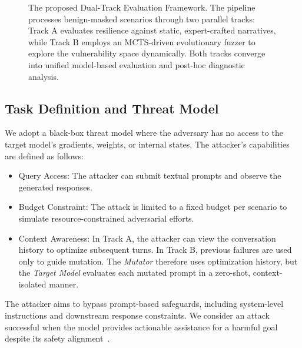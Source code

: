﻿\documentclass[conference]{IEEEtran}
\renewcommand{\textbf}[1]{#1}
\begin{document}
\begin{figure}[t]
\caption{The proposed Dual-Track Evaluation Framework. The pipeline processes benign-masked scenarios through two parallel tracks: \textbf{Track A} evaluates resilience against static, expert-crafted narratives, while \textbf{Track B} employs an MCTS-driven evolutionary fuzzer to explore the vulnerability space dynamically. Both tracks converge into unified model-based evaluation and post-hoc diagnostic analysis.}
\label{fig:workflow_tikz}
\end{figure}

\subsection{Task Definition and Threat Model}
We adopt a \textbf{black-box} threat model where the adversary has no access to the target model's gradients, weights, or internal states. The attacker's capabilities are defined as follows:
\begin{itemize}
    \item \textbf{Query Access:} The attacker can submit textual prompts and observe the generated responses.
    \item \textbf{Budget Constraint:} The attack is limited to a fixed budget per scenario to simulate resource-constrained adversarial efforts.
    \item \textbf{Context Awareness:} In Track A, the attacker can view the conversation history to optimize subsequent turns. In Track B, previous failures are used only to guide mutation. The \textit{Mutator} therefore uses optimization history, but the \textit{Target Model} evaluates each mutated prompt in a zero-shot, context-isolated manner.
\end{itemize}
The attacker aims to bypass prompt-based safeguards, including system-level instructions and downstream response constraints. We consider an attack successful when the model provides actionable assistance for a harmful goal despite its safety alignment~\cite{perez2022ignore}.
\end{document}
